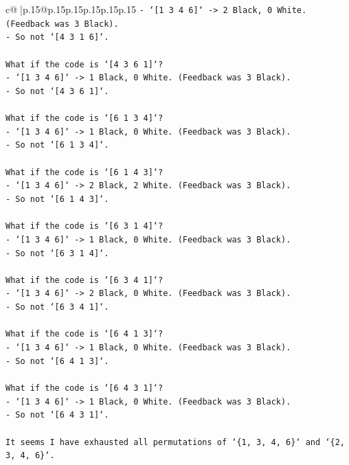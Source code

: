 \documentclass{article}
\begin{document}
{\begin{supertabular}{c@{$\;$}|p{.15\linewidth}@{}p{.15\linewidth}p{.15\linewidth}p{.15\linewidth}p{.15\linewidth}p{.15\linewidth}}
{{{\texttt{{-} `{[}1 3 4 6{]}` {-}> 2 Black, 0 White. (Feedback was 3 Black).} \\
\texttt{{-} So not `{[}4 3 1 6{]}`.} \\
\\ 
\texttt{What if the code is `{[}4 3 6 1{]}`?} \\
\texttt{{-} `{[}1 3 4 6{]}` {-}> 1 Black, 0 White. (Feedback was 3 Black).} \\
\texttt{{-} So not `{[}4 3 6 1{]}`.} \\
\\ 
\texttt{What if the code is `{[}6 1 3 4{]}`?} \\
\texttt{{-} `{[}1 3 4 6{]}` {-}> 1 Black, 0 White. (Feedback was 3 Black).} \\
\texttt{{-} So not `{[}6 1 3 4{]}`.} \\
\\ 
\texttt{What if the code is `{[}6 1 4 3{]}`?} \\
\texttt{{-} `{[}1 3 4 6{]}` {-}> 2 Black, 2 White. (Feedback was 3 Black).} \\
\texttt{{-} So not `{[}6 1 4 3{]}`.} \\
\\ 
\texttt{What if the code is `{[}6 3 1 4{]}`?} \\
\texttt{{-} `{[}1 3 4 6{]}` {-}> 1 Black, 0 White. (Feedback was 3 Black).} \\
\texttt{{-} So not `{[}6 3 1 4{]}`.} \\
\\ 
\texttt{What if the code is `{[}6 3 4 1{]}`?} \\
\texttt{{-} `{[}1 3 4 6{]}` {-}> 2 Black, 0 White. (Feedback was 3 Black).} \\
\texttt{{-} So not `{[}6 3 4 1{]}`.} \\
\\ 
\texttt{What if the code is `{[}6 4 1 3{]}`?} \\
\texttt{{-} `{[}1 3 4 6{]}` {-}> 1 Black, 0 White. (Feedback was 3 Black).} \\
\texttt{{-} So not `{[}6 4 1 3{]}`.} \\
\\ 
\texttt{What if the code is `{[}6 4 3 1{]}`?} \\
\texttt{{-} `{[}1 3 4 6{]}` {-}> 1 Black, 0 White. (Feedback was 3 Black).} \\
\texttt{{-} So not `{[}6 4 3 1{]}`.} \\
\\ 
\texttt{It seems I have exhausted all permutations of `\{1, 3, 4, 6\}` and `\{2, 3, 4, 6\}`.} \\
}}}
\end{supertabular}}
\end{document}
